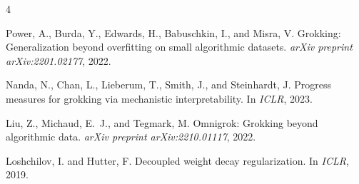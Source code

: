 \documentclass[11pt,a4paper]{article}
\begin{document}

\begin{thebibliography}{4}

Power, A., Burda, Y., Edwards, H., Babuschkin, I., and Misra, V.
\newblock Grokking: Generalization beyond overfitting on small algorithmic datasets.
\newblock \emph{arXiv preprint arXiv:2201.02177}, 2022.

Nanda, N., Chan, L., Lieberum, T., Smith, J., and Steinhardt, J.
\newblock Progress measures for grokking via mechanistic interpretability.
\newblock In \emph{ICLR}, 2023.

Liu, Z., Michaud, E.~J., and Tegmark, M.
\newblock Omnigrok: Grokking beyond algorithmic data.
\newblock \emph{arXiv preprint arXiv:2210.01117}, 2022.

Loshchilov, I. and Hutter, F.
\newblock Decoupled weight decay regularization.
\newblock In \emph{ICLR}, 2019.

\end{thebibliography}
\end{document}
